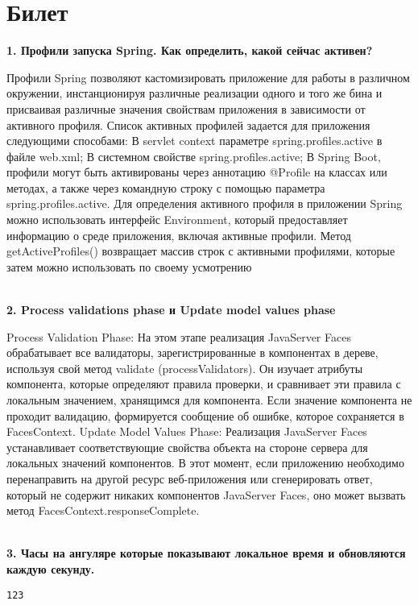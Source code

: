 \documentclass{article}
\newcommand{\bil}[5]{%
        \section{Билет}
        \textbf{1. #1}

        #4
        \\
        \textbf{2. #2}
        
        #5
        \\
        \textbf{3. #3}
}
\begin{document}
\bil{Профили запуска Spring. Как определить, какой сейчас активен?}
{Process validations phase и Update model values phase}
{Часы на ангуляре которые показывают локальное время и обновляются каждую секунду.}{
    Профили Spring позволяют кастомизировать приложение для работы в различном окружении, инстанционируя различные реализации одного и того же бина и присваивая различные значения свойствам приложения в зависимости от активного профиля.
    Список активных профилей задается для приложения следующими способами: В servlet context параметре spring.profiles.active в файле web.xml; В системном свойстве spring.profiles.active;
    В Spring Boot, профили могут быть активированы через аннотацию @Profile на классах или методах, а также через командную строку с помощью параметра spring.profiles.active.
    Для определения активного профиля в приложении Spring можно использовать интерфейс Environment, который предоставляет информацию о среде приложения, включая активные профили. Метод getActiveProfiles() возвращает массив строк с активными профилями, которые затем можно использовать по своему усмотрению
}{
    Process Validation Phase: На этом этапе реализация JavaServer Faces обрабатывает все валидаторы, зарегистрированные в компонентах в дереве, используя свой метод validate (processValidators). 
    Он изучает атрибуты компонента, которые определяют правила проверки, и сравнивает эти правила с локальным значением, хранящимся для компонента. 
    Если значение компонента не проходит валидацию, формируется сообщение об ошибке, которое сохраняется в FacesContext. 
    Update Model Values Phase: Реализация JavaServer Faces устанавливает соответствующие свойства объекта на стороне сервера для локальных значений компонентов. 
    В этот момент, если приложению необходимо перенаправить на другой ресурс веб-приложения или сгенерировать ответ, который не содержит никаких компонентов JavaServer Faces, оно может вызвать метод FacesContext.responseComplete.
}
\begin{lstlisting}[frame=single, basicstyle=\ttfamily, breaklines=true, breakatwhitespace=true, postbreak=\mbox{\textcolor{red}{$\hookrightarrow$}\space}]
123
\end{lstlisting}
\end{document}
